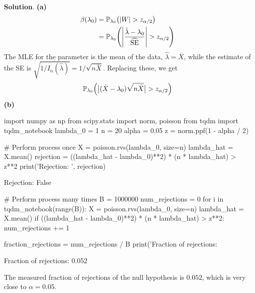 \textbf{Solution}.
\textbf{(a)}
\begin{align*}
\beta(\lambda_{0}) &= \PROB_{\lambda_{0}}\left( |W| > z_{\alpha/2} \right)  \\
&= \PROB_{\lambda_{0}}\left( \Bigg| \frac{\hat{\lambda} - \lambda_{0}}{\widehat{\SE}} \Bigg| > z_{\alpha/2} \right)
\end{align*}
The MLE for the parameter is the mean of the data,
\(\hat{\lambda} = \bar{X}\), while the estimate of the SE is
\(\sqrt{1 / I_{n}(\hat{\lambda})} = 1 / \sqrt{n\bar{X}}\). Replacing
these, we get
\[
\PROB_{\lambda_{0}}\left( \big| (\bar{X} - \lambda_{0})\sqrt{n \bar{X}} \big| > z_{\alpha/2} \right)
\]
\textbf{(b)}

\begin{python}
import numpy as np
from scipy.stats import norm, poisson
from tqdm import tqdm_notebook
lambda_0 = 1
n = 20
alpha = 0.05
z = norm.ppf(1 - alpha / 2)
\end{python}

\begin{python}
# Perform process once
X = poisson.rvs(lambda_0, size=n)
lambda_hat = X.mean()
rejection = ((lambda_hat - lambda_0)**2) * (n * lambda_hat) > z**2
print('Rejection: ', rejection)
\end{python}
\begin{console}
Rejection:  False
\end{console}

\begin{python}
# Perform process many times
B = 1000000
num_rejections = 0
for i in tqdm_notebook(range(B)):
    X = poisson.rvs(lambda_0, size=n)
    lambda_hat = X.mean()
    if ((lambda_hat - lambda_0)**2) * (n * lambda_hat) > z**2:
        num_rejections += 1
        
fraction_rejections = num_rejections / B
print('Fraction of rejections: %
\end{python}
\begin{console}
Fraction of rejections: 0.052
\end{console}
The measured fraction of rejections of the null hypothesis is \(0.052\),
which is very close to \(\alpha = 0.05\).
